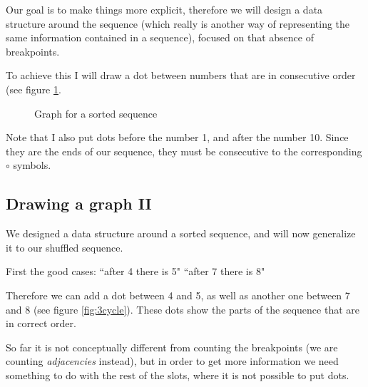 \documentclass[11pt,final,twoside,nofrench]{thlifl}
\begin{document}
Our goal is to make things more explicit, therefore we will design a data structure around the sequence (which really is another way of representing the same information contained in a sequence), focused on that absence of breakpoints.

To achieve this I will draw a dot between numbers that are in consecutive order (see figure \ref{fig:sortedgraph}.

\begin{figure}[htbp]
    \centering
    

\caption{Graph for a sorted sequence}
\label{fig:sortedgraph}
\end{figure}

Note that I also put dots before the number 1, and after the number 10. Since they are the ends of our sequence, they must be consecutive to the corresponding $\circ$ symbols.

\subsection{Drawing a graph II}

We designed a data structure around a sorted sequence, and will now generalize it to our shuffled sequence.

First the good cases:
``after 4 there is 5"
``after 7 there is 8"

Therefore we can add a dot between 4 and 5, as well as another one between 7 and 8 (see figure \ref{fig:3cycle}). These dots show the parts of the sequence that are in correct order.

So far it is not conceptually different from counting the breakpoints (we are counting \emph{adjacencies} instead), but in order to get more information we need something to do with the rest of the slots, where it is not possible to put dots.
\end{document}

